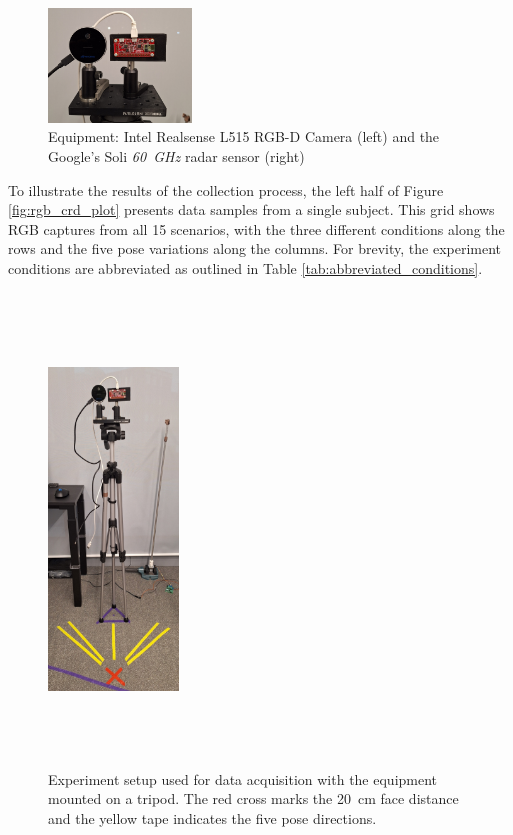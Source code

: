\documentclass{mpaper}
\begin{document}
\begin{figure}[h!]
    \centering
    \vspace{-0.42cm}
    \includegraphics[width=0.34\textwidth,decodearray={1 1 1 1 1 1}]{figures/equipment.pdf}
    \vspace{0.1cm}
    \caption{Equipment: Intel Realsense L515 RGB-D Camera (left) and the Google's Soli \textit{\qty{60}{\GHz}} radar sensor (right)}
    \label{fig:equipment}
    \vspace{-0.5cm}
\end{figure}

To illustrate the results of the collection process, the left half of Figure \ref{fig:rgb_crd_plot} presents data samples from a single subject. This grid shows RGB captures from all 15 scenarios, with the three different conditions along the rows and the five pose variations along the columns. For brevity, the experiment conditions are abbreviated as outlined in Table \ref{tab:abbreviated_conditions}.

\begin{figure}[t]
    \centering
    \vspace{-0.42cm}
    \includegraphics[width=0.31\textwidth, height=12.5cm]{figures/experiment_setup.pdf}
    \vspace{0.2cm}
    \caption{Experiment setup used for data acquisition with the equipment mounted on a tripod. The red cross marks the \qty{20}{\cm} face distance and the yellow tape indicates the five pose directions.}
    \label{fig:experiment_setup}
    \vspace{-0.3cm}
\end{figure}
\end{document}
